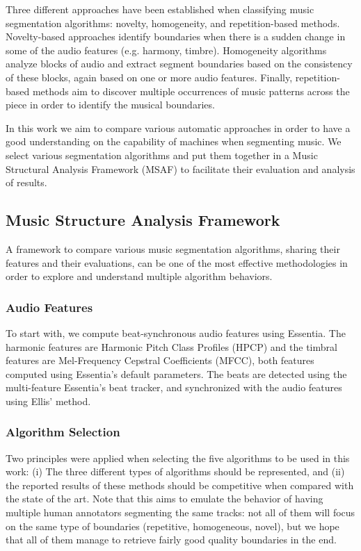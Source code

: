 \documentclass{article}
\begin{document}
Three different approaches have been established when classifying music segmentation algorithms: novelty, homogeneity, and repetition-based methods\cite{Paulus2010}. 
Novelty-based approaches identify boundaries when there is a sudden change in some of the audio features (e.g. harmony, timbre).
Homogeneity algorithms analyze blocks of audio and extract segment boundaries based on the consistency of these blocks, again based on one or more audio features.
Finally, repetition-based methods aim to discover multiple occurrences of music patterns across the piece in order to identify the musical boundaries.

In this work we aim to compare various automatic approaches in order to have a good understanding on the capability of machines when segmenting music.
We select various segmentation algorithms and put them together in a Music Structural Analysis Framework (MSAF) to facilitate their evaluation and analysis of results.

\subsection{Music Structure Analysis Framework}

A framework to compare various music segmentation algorithms, sharing their features and their evaluations, can be one of the most effective methodologies in order to explore and understand multiple algorithm behaviors.

\subsubsection{Audio Features}

To start with, we compute beat-synchronous audio features using Essentia\cite{Bogdanov2013}.
The harmonic features are Harmonic Pitch Class Profiles (HPCP) and the timbral features are Mel-Frequency Cepstral Coefficients (MFCC), both features computed using Essentia's default parameters.
The beats are detected using the multi-feature Essentia's beat tracker, and synchronized with the audio features using Ellis' method\cite{Ellis2007}.

\subsubsection{Algorithm Selection}

Two principles were applied when selecting the five algorithms to be used in this work: (i) The three different types of algorithms should be represented, and (ii) the reported results of these methods should be competitive when compared with the state of the art.
Note that this aims to emulate the behavior of having multiple human annotators segmenting the same tracks: not all of them will focus on the same type of boundaries (repetitive, homogeneous, novel), but we hope that all of them manage to retrieve fairly good quality boundaries in the end.
\end{document}
